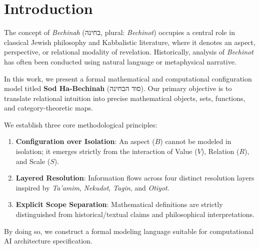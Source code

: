 \section{Introduction}
\label{sec:introduction}

The concept of \emph{Bechinah} (בחינה, plural: \emph{Bechinot}) occupies a central role in classical Jewish philosophy and Kabbalistic literature, where it denotes an aspect, perspective, or relational modality of revelation. Historically, analysis of \emph{Bechinot} has often been conducted using natural language or metaphysical narrative.

In this work, we present a formal mathematical and computational configuration model titled \textbf{Sod Ha-Bechinah} (סוד הבחינה). Our primary objective is to translate relational intuition into precise mathematical objects, sets, functions, and category-theoretic maps.

We establish three core methodological principles:
\begin{enumerate}
    \item \textbf{Configuration over Isolation}: An aspect ($B$) cannot be modeled in isolation; it emerges strictly from the interaction of Value ($V$), Relation ($R$), and Scale ($S$).
    \item \textbf{Layered Resolution}: Information flows across four distinct resolution layers inspired by \emph{Ta'amim}, \emph{Nekudot}, \emph{Tagin}, and \emph{Otiyot}.
    \item \textbf{Explicit Scope Separation}: Mathematical definitions are strictly distinguished from historical/textual claims and philosophical interpretations.
\end{enumerate}

By doing so, we construct a formal modeling language suitable for computational AI architecture specification.
